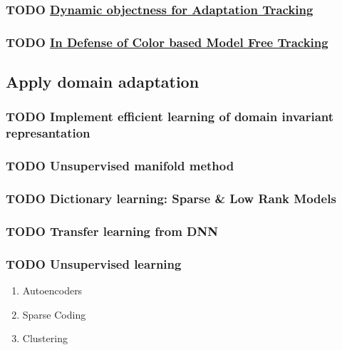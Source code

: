 \documentclass[11pt]{article}
\begin{document}
\subsubsection{{\bfseries\sffamily TODO} \href{http://www.vision.ee.ethz.ch/\~hegrabne/papers/Stalder2012DynamicObjectnessAdaptive.pdf}{Dynamic objectness for Adaptation Tracking}}
\label{sec:orgf923708}
\subsubsection{{\bfseries\sffamily TODO} \href{http://www.cv-foundation.org/openaccess/content\_cvpr\_2015/papers/Possegger\_In\_Defense\_of\_2015\_CVPR\_paper.pdf}{In Defense of Color based Model Free Tracking}}
\label{sec:org1dc7896}
\subsection{Apply domain adaptation}
\label{sec:org50ec531}
\subsubsection{{\bfseries\sffamily TODO} Implement efficient learning of domain invariant represantation}
\label{sec:org15d4136}
\subsubsection{{\bfseries\sffamily TODO} Unsupervised manifold method}
\label{sec:org795b923}
\subsubsection{{\bfseries\sffamily TODO} Dictionary learning: Sparse \& Low Rank Models}
\label{sec:org3a34556}
\subsubsection{{\bfseries\sffamily TODO} Transfer learning from DNN}
\label{sec:org13074be}
\subsubsection{{\bfseries\sffamily TODO} Unsupervised learning}
\label{sec:org62107bf}
\begin{enumerate}
\item Autoencoders
\label{sec:org595bff7}
\item Sparse Coding
\label{sec:org85cb829}
\item Clustering
\label{sec:org50e909a}
\end{enumerate}
\end{document}
